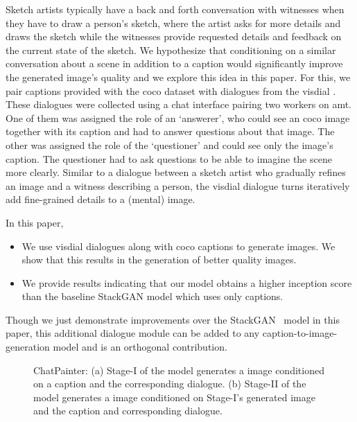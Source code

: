 \documentclass{article}
\begin{document}
Sketch artists typically have a back and forth conversation with witnesses when they have to draw a person's sketch, where the artist asks for more details and draws the sketch while the witnesses provide requested details and feedback on the current state of the sketch. 
We hypothesize that conditioning on a similar conversation about a scene in addition to a caption would significantly improve the generated image's quality and we explore this idea in this paper.
For this, we pair captions provided with the \gls{coco} dataset with dialogues from the \gls{visdial} \cite{das2016visual}. These dialogues were collected using a chat interface pairing two workers on \gls{amt}. One of them was assigned the role of an `answerer', who could see an \gls{coco} image together with its caption and had to answer questions about that image. The other was assigned the role of the `questioner' and could see only the image's caption. 
The questioner had to ask questions to be able to imagine the scene more clearly.
Similar to a dialogue between a sketch artist who gradually refines an image and a witness describing a person, the \gls{visdial} dialogue turns iteratively add fine-grained details to a (mental) image. 

In this paper,
\begin{itemize}
    \item We use \gls{visdial} dialogues along with \gls{coco} captions to generate images. We show that this results in the generation of better quality images. 
    \item We provide results indicating that our model obtains a higher inception score than the baseline StackGAN model which uses only captions.
\end{itemize}
Though we just demonstrate improvements over the StackGAN~\cite{Zhang_2017_ICCV} model in this paper, this additional dialogue module can be added to any caption-to-image-generation model and is an orthogonal contribution.

\begin{figure*}[ht]
\vskip 0.2in
\begin{center}
\centerline{
}
\centerline{
}
\caption{ChatPainter: (a) Stage-I of the model generates a  image conditioned on a caption and the corresponding dialogue. (b) Stage-II of the model generates a  image conditioned on Stage-I's  generated image and the caption and corresponding dialogue.}
\label{fig:model}
\end{center}
\vskip -0.2in
\end{figure*}
\end{document}
